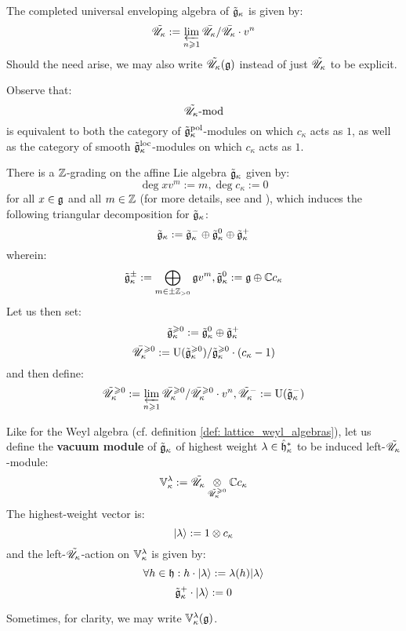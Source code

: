         \begin{definition}
            The completed universal enveloping algebra of $\tilde{\mathfrak{g}}_{\kappa}$ is given by:
                $$\tilde{\mathscr{U}}_{\kappa} := \varprojlim_{n \geqslant 1} \bar{\mathscr{U}}_{\kappa}/\bar{\mathscr{U}}_{\kappa} \cdot v^n$$
            Should the need arise, we may also write $\tilde{\mathscr{U}}_{\kappa}(\mathfrak{g})$ instead of just $\tilde{\mathscr{U}}_{\kappa}$ to be explicit.
        \end{definition}
        \begin{remark}
            Observe that:
                $$\tilde{\mathscr{U}}_{\kappa}\text{-}\mathrm{mod}$$
            is equivalent to both the category of $\tilde{\mathfrak{g}}_{\kappa}^{\mathrm{pol}}$-modules on which $c_{\kappa}$ acts as $1$, as well as the category of smooth $\tilde{\mathfrak{g}}_{\kappa}^{\mathrm{loc}}$-modules on which $c_{\kappa}$ acts as $1$.
        \end{remark}
        There is a $\mathbb{Z}$-grading on the affine Lie algebra $\tilde{\mathfrak{g}}_{\kappa}$ given by:
            $$\deg x v^m := m, \deg c_{\kappa} := 0$$
        for all $x \in \mathfrak{g}$ and all $m \in \mathbb{Z}$ (for more details, see \cite{kassel_universal_central_extensions_of_lie_algebras} and \cite[Subsection 2.3.2]{msc_thesis_gamma_extended_toroidal_lie_algebras}), which induces the following triangular decomposition for $\tilde{\mathfrak{g}}_{\kappa}$:
            $$\tilde{\mathfrak{g}}_{\kappa} := \tilde{\mathfrak{g}}_{\kappa}^- \oplus \tilde{\mathfrak{g}}_{\kappa}^0 \oplus \tilde{\mathfrak{g}}_{\kappa}^+$$
        wherein:
            $$\tilde{\mathfrak{g}}_{\kappa}^{\pm} := \bigoplus_{m \in \pm \mathbb{Z}_{> 0}} \mathfrak{g} v^m, \tilde{\mathfrak{g}}_{\kappa}^0 := \mathfrak{g} \oplus \mathbb{C} c_{\kappa}$$
        Let us then set:
            $$\tilde{\mathfrak{g}}_{\kappa}^{\geqslant 0} := \tilde{\mathfrak{g}}_{\kappa}^0 \oplus \tilde{\mathfrak{g}}_{\kappa}^+$$
            $$\bar{\mathscr{U}}_{\kappa}^{\geqslant 0} := \mathrm{U}(\tilde{\mathfrak{g}}_{\kappa}^{\geqslant 0})/\tilde{\mathfrak{g}}_{\kappa}^{\geqslant 0} \cdot (c_{\kappa} - 1)$$
        and then define:
            $$\tilde{\mathscr{U}}_{\kappa}^{\geqslant 0} := \varprojlim_{n \geqslant 1} \bar{\mathscr{U}}_{\kappa}^{\geqslant 0}/\bar{\mathscr{U}}_{\kappa}^{\geqslant 0} \cdot v^n, \tilde{\mathscr{U}}_{\kappa}^- := \mathrm{U}(\tilde{\mathfrak{g}}_{\kappa}^-)$$
        \begin{definition}
            Like for the Weyl algebra (cf. definition \ref{def: lattice_weyl_algebras}), let us define the \textbf{vacuum module} of $\tilde{\mathfrak{g}}_{\kappa}$ of highest weight $\lambda \in \hat{\mathfrak{h}}_{\kappa}^*$ to be induced left-$\tilde{\mathscr{U}}_{\kappa}$-module:
                $$\V_{\kappa}^{\lambda} := \tilde{\scrU}_{\kappa} \tensor_{\tilde{\scrU}_{\kappa}^{\geq 0}} \bbC c_{\kappa}$$
            The highest-weight vector is:
                $$\ket{\lambda} := 1 \tensor c_{\kappa}$$
            and the left-$\tilde{\mathscr{U}}_{\kappa}$-action on $\mathbb{V}_{\kappa}^{\lambda}$ is given by:
                $$\forall h \in \mathfrak{h}: h \cdot \lvert {\lambda} \rangle := \lambda(h) \lvert {\lambda} \rangle$$
                $$\tilde{\mathfrak{g}}_{\kappa}^+ \cdot \lvert {\lambda} \rangle := 0$$
            
            Sometimes, for clarity, we may write $\mathbb{V}_{\kappa}^{\lambda}(\mathfrak{g})$.
        \end{definition}
